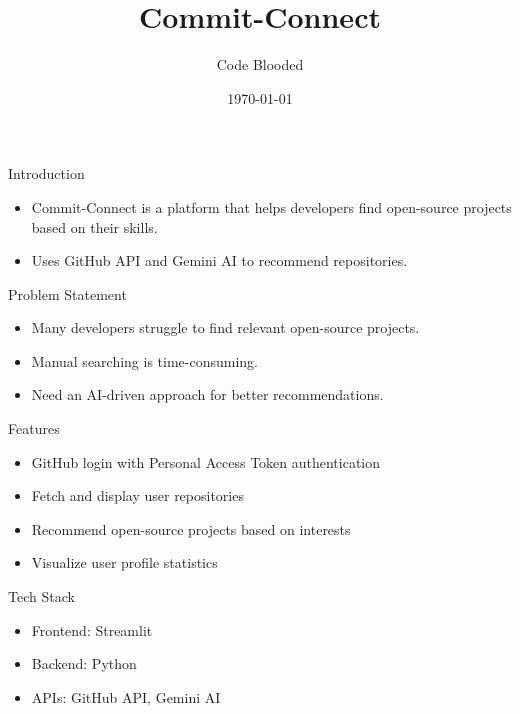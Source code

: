 \documentclass{beamer}
\title{Commit-Connect}
\author{Code Blooded}
\date{\today}
\begin{document}
\begin{frame}
    \titlepage
\end{frame}

\begin{frame}{Introduction}
    \begin{itemize}
        \item Commit-Connect is a platform that helps developers find open-source projects based on their skills.
        \item Uses GitHub API and Gemini AI to recommend repositories.
    \end{itemize}
\end{frame}

\begin{frame}{Problem Statement}
    \begin{itemize}
        \item Many developers struggle to find relevant open-source projects.
        \item Manual searching is time-consuming.
        \item Need an AI-driven approach for better recommendations.
    \end{itemize}
\end{frame}

\begin{frame}{Features}
    \begin{itemize}
        \item GitHub login with Personal Access Token authentication
        \item Fetch and display user repositories
        \item Recommend open-source projects based on interests
        \item Visualize user profile statistics
    \end{itemize}
\end{frame}

\begin{frame}{Tech Stack}
    \begin{itemize}
        \item Frontend: Streamlit
        \item Backend: Python
        \item APIs: GitHub API, Gemini AI
        
    \end{itemize}
\end{frame}
\end{document}
